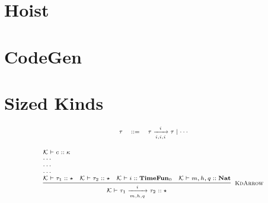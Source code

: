 \documentclass[fleqn]{article}
\begin{document}
\section{Hoist}

\section{CodeGen}

\section{Sized Kinds}

\[
\scriptsize
\begin{array}{rcl}
	\tau & ::= & \tau \xrightarrow[i,i,i]{i} \tau \mid \cdots
\end{array}
\]

\[
\scriptsize
\begin{array}{l}
	\mathcal{K} \vdash c :: \kappa \\
	\cdots \\
	\cdots \\
	\cdots \\
	\infer[\textsc{KdArrow}]{\mathcal{K} \vdash \tau_1 \xrightarrow[m,h,q]{i} \tau_2 :: \star}{\mathcal{K} \vdash \tau_1 :: \star & \mathcal{K} \vdash \tau_2 :: \star & \mathcal{K} \vdash i :: \mathbf{TimeFun}_0 & \mathcal{K} \vdash m,h,q :: \mathbf{Nat}}
\end{array}
\]

\newcommand{\jtygc}[7]{#1 \vdash #2 : #3 \triangleright #4 \mid (#5, #6, #7)}
\end{document}

